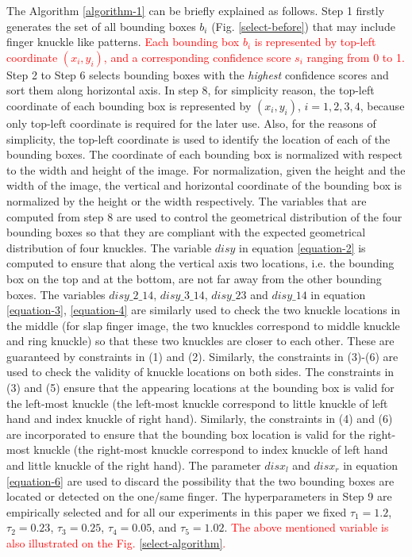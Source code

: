 The Algorithm \ref{algorithm-1} can be briefly explained as follows. Step 1 firstly generates the set of all bounding boxes $b_i$ (Fig. \ref{select-before}) that may include finger knuckle like patterns. \textcolor{red}{Each bounding box $b_i$ is represented by top-left coordinate $(x_{i},y_{i})$, and a corresponding confidence score $s_i$ ranging from 0 to 1.} Step 2 to Step 6 selects bounding boxes with the \textit{highest} confidence scores and sort them along horizontal axis. In step 8, for simplicity reason, the top-left coordinate of each bounding box is represented by $(x_i,y_i)$, $i=1,2,3,4$, because only top-left coordinate is required for the later use. Also, for the reasons of simplicity, the top-left coordinate is used to identify the location of each of the bounding boxes. The coordinate of each bounding box is normalized with respect to the width and height of the image. For normalization, given the height and the width of the image, the vertical and horizontal coordinate of the bounding box is normalized by the height or the width respectively. The variables that are computed from step 8 are used to control the geometrical distribution of the four bounding boxes so that they are compliant with the expected geometrical distribution of four knuckles. The variable $disy$ in equation \ref{equation-2} is computed to ensure that along the vertical axis two locations, i.e. the bounding box on the top and at the bottom, are not far away from the other bounding boxes. The variables $disy\_2\_14$, $disy\_3\_14$, $disy\_23$ and $disy\_14$ in equation \ref{equation-3}, \ref{equation-4} are similarly used to check the two knuckle locations in the middle (for slap finger image, the two knuckles correspond to middle knuckle and ring knuckle) so that these two knuckles are closer to each other. These are guaranteed by constraints in (1) and (2). Similarly, the constraints in (3)-(6) are used to check the validity of knuckle locations on both sides. The constraints in (3) and (5) ensure that the appearing locations at the bounding box is valid for the left-most knuckle (the left-most knuckle correspond to little knuckle of left hand and index knuckle of right hand). Similarly, the constraints in (4) and (6) are incorporated to ensure that the bounding box location is valid for the right-most knuckle (the right-most knuckle correspond to index knuckle of left hand and little knuckle of the right hand). The parameter $disx_l$ and $disx_r$ in equation \ref{equation-6} are used to discard the possibility that the two bounding boxes are located or detected on the one/same finger. The hyperparameters in Step 9 are empirically selected and for all our experiments in this paper we fixed $\tau_1=1.2$, $\tau_2=0.23$, $\tau_3=0.25$, $\tau_4=0.05$, and $\tau_5=1.02$. \textcolor{red}{The above mentioned variable is also illustrated on the Fig. \ref{select-algorithm}.}

